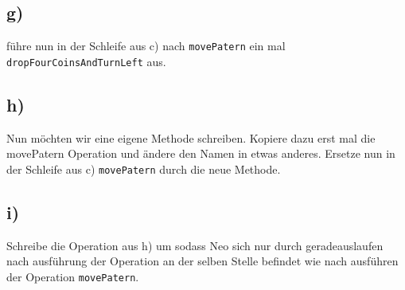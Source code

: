 \subsection*{g)}
führe nun in der Schleife aus c) nach \lstinline{movePatern} ein mal \lstinline{dropFourCoinsAndTurnLeft} aus.
\subsection*{h)}
Nun möchten wir eine eigene Methode schreiben. Kopiere dazu erst mal die movePatern Operation und ändere den Namen in etwas anderes.
Ersetze nun in der Schleife aus c) \lstinline{movePatern} durch die neue Methode.
\subsection*{i)}
Schreibe die Operation aus h) um sodass Neo sich nur durch geradeauslaufen nach ausführung der Operation an der selben Stelle befindet wie nach ausführen der Operation  \lstinline{movePatern}.
\newpage
